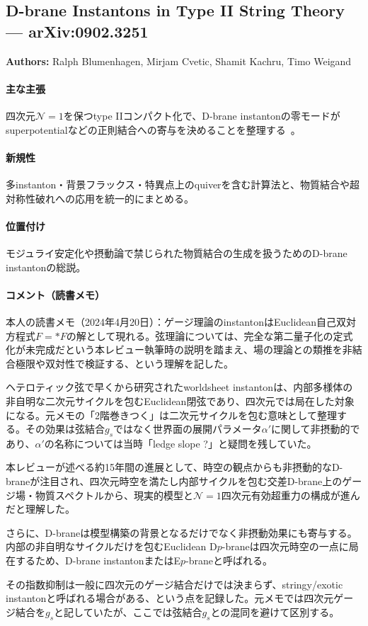 \subsection{D-brane Instantons in Type II String Theory --- arXiv:0902.3251}

\textbf{Authors:} Ralph Blumenhagen, Mirjam Cvetic, Shamit Kachru, Timo Weigand

\paragraph{主な主張}
四次元$\mathcal{N}=1$を保つtype IIコンパクト化で、D-brane instantonの零モードがsuperpotentialなどの正則結合への寄与を決めることを整理する~\cite{Blumenhagen:2009qh}。

\paragraph{新規性}
多instanton・背景フラックス・特異点上のquiverを含む計算法と、物質結合や超対称性破れへの応用を統一的にまとめる。

\paragraph{位置付け}
モジュライ安定化や摂動論で禁じられた物質結合の生成を扱うためのD-brane instantonの総説。

\paragraph{コメント（読書メモ）}
本人の読書メモ（2024年4月20日）：ゲージ理論のinstantonはEuclidean自己双対方程式$F=*F$の解として現れる。弦理論については、完全な第二量子化の定式化が未完成だという本レビュー執筆時の説明を踏まえ、場の理論との類推を非結合極限や双対性で検証する、という理解を記した。

ヘテロティック弦で早くから研究されたworldsheet instantonは、内部多様体の非自明な二次元サイクルを包むEuclidean閉弦であり、四次元では局在した対象になる。元メモの「2階巻きつく」は二次元サイクルを包む意味として整理する。その効果は弦結合$g_s$ではなく世界面の展開パラメータ$\alpha'$に関して非摂動的であり、$\alpha'$の名称については当時「ledge slope ?」と疑問を残していた。

本レビューが述べる約15年間の進展として、時空の観点からも非摂動的なD-braneが注目され、四次元時空を満たし内部サイクルを包む交差D-brane上のゲージ場・物質スペクトルから、現実的模型と$\mathcal{N}=1$四次元有効超重力の構成が進んだと理解した。

さらに、D-braneは模型構築の背景となるだけでなく非摂動効果にも寄与する。内部の非自明なサイクルだけを包むEuclidean D$p$-braneは四次元時空の一点に局在するため、D-brane instantonまたはE$p$-braneと呼ばれる。

その指数抑制は一般に四次元のゲージ結合だけでは決まらず、stringy/exotic instantonと呼ばれる場合がある、という点を記録した。元メモでは四次元ゲージ結合を$g_s$と記していたが、ここでは弦結合$g_s$との混同を避けて区別する。
